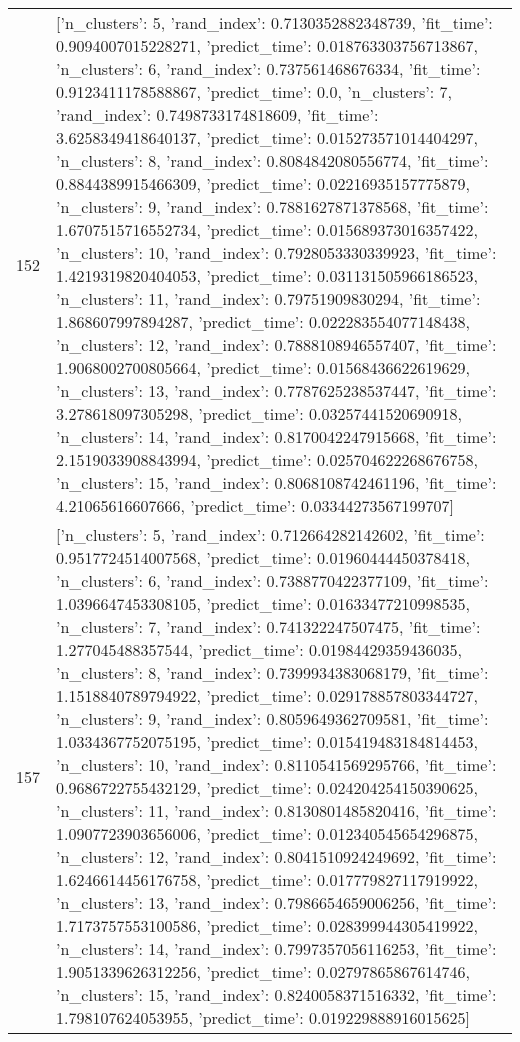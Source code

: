 \begin{tabular}{rl}
152 & [{'n_clusters': 5, 'rand_index': 0.7130352882348739, 'fit_time': 0.9094007015228271, 'predict_time': 0.018763303756713867}, {'n_clusters': 6, 'rand_index': 0.737561468676334, 'fit_time': 0.9123411178588867, 'predict_time': 0.0}, {'n_clusters': 7, 'rand_index': 0.7498733174818609, 'fit_time': 3.6258349418640137, 'predict_time': 0.015273571014404297}, {'n_clusters': 8, 'rand_index': 0.8084842080556774, 'fit_time': 0.8844389915466309, 'predict_time': 0.02216935157775879}, {'n_clusters': 9, 'rand_index': 0.7881627871378568, 'fit_time': 1.6707515716552734, 'predict_time': 0.015689373016357422}, {'n_clusters': 10, 'rand_index': 0.7928053330339923, 'fit_time': 1.4219319820404053, 'predict_time': 0.031131505966186523}, {'n_clusters': 11, 'rand_index': 0.79751909830294, 'fit_time': 1.868607997894287, 'predict_time': 0.022283554077148438}, {'n_clusters': 12, 'rand_index': 0.7888108946557407, 'fit_time': 1.9068002700805664, 'predict_time': 0.01568436622619629}, {'n_clusters': 13, 'rand_index': 0.7787625238537447, 'fit_time': 3.278618097305298, 'predict_time': 0.03257441520690918}, {'n_clusters': 14, 'rand_index': 0.8170042247915668, 'fit_time': 2.1519033908843994, 'predict_time': 0.025704622268676758}, {'n_clusters': 15, 'rand_index': 0.8068108742461196, 'fit_time': 4.21065616607666, 'predict_time': 0.03344273567199707}] \\
157 & [{'n_clusters': 5, 'rand_index': 0.712664282142602, 'fit_time': 0.9517724514007568, 'predict_time': 0.01960444450378418}, {'n_clusters': 6, 'rand_index': 0.7388770422377109, 'fit_time': 1.0396647453308105, 'predict_time': 0.01633477210998535}, {'n_clusters': 7, 'rand_index': 0.741322247507475, 'fit_time': 1.277045488357544, 'predict_time': 0.01984429359436035}, {'n_clusters': 8, 'rand_index': 0.7399934383068179, 'fit_time': 1.1518840789794922, 'predict_time': 0.029178857803344727}, {'n_clusters': 9, 'rand_index': 0.8059649362709581, 'fit_time': 1.0334367752075195, 'predict_time': 0.015419483184814453}, {'n_clusters': 10, 'rand_index': 0.8110541569295766, 'fit_time': 0.9686722755432129, 'predict_time': 0.024204254150390625}, {'n_clusters': 11, 'rand_index': 0.8130801485820416, 'fit_time': 1.0907723903656006, 'predict_time': 0.012340545654296875}, {'n_clusters': 12, 'rand_index': 0.8041510924249692, 'fit_time': 1.6246614456176758, 'predict_time': 0.017779827117919922}, {'n_clusters': 13, 'rand_index': 0.7986654659006256, 'fit_time': 1.7173757553100586, 'predict_time': 0.028399944305419922}, {'n_clusters': 14, 'rand_index': 0.7997357056116253, 'fit_time': 1.9051339626312256, 'predict_time': 0.02797865867614746}, {'n_clusters': 15, 'rand_index': 0.8240058371516332, 'fit_time': 1.798107624053955, 'predict_time': 0.019229888916015625}] \\

\end{tabular}
